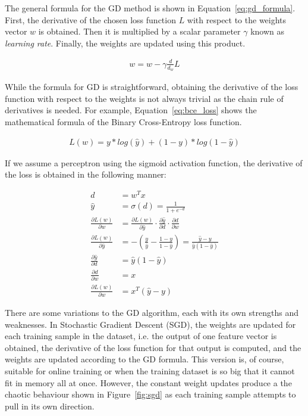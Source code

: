 The general formula for the GD method is shown in Equation~\ref{eq:gd_formula}. First, the derivative of the chosen loss function $L$ with respect to the weights vector $w$ is obtained. Then it is multiplied by a scalar parameter $\gamma$ known as \textit{learning rate}. Finally, the weights are updated using this product.

\begin{align}
    w = w - \gamma \frac{d}{d_w}L
    \label{eq:gd_formula}
\end{align}

While the formula for GD is straightforward, obtaining the derivative of the loss function with respect to the weights is not always trivial as the chain rule of derivatives is needed. For example, Equation~\ref{eq:bce_loss} shows the mathematical formula of the Binary Cross-Entropy loss function.

\begin{align}
    L(w) = y * log(\hat{y}) + (1 - y) * log(1 - \hat{y})
    \label{eq:bce_loss}
\end{align}

If we assume a perceptron using the sigmoid activation function, the derivative of the loss is obtained in the following manner:

\begin{align}
    d &= w^T x \\
    \hat{y} &= \sigma(d) = \frac{1}{1 + e^{-d}} \\
    \frac{\partial L(w)}{\partial w} &= \frac{\partial L(w)}{\partial \hat{y}} \cdot \frac{\partial \hat{y}}{\partial d} \cdot \frac{\partial d}{\partial w}\\
    \frac{\partial L(w)}{\partial \hat{y}} &= -(\frac{y}{\hat{y}} - \frac{1 - y}{1 - \hat{y}}) = \frac{\hat{y} - y}{\hat{y}(1-\hat{y})} \\
    \frac{\partial \hat{y}}{\partial d} &= \hat{y}(1 - \hat{y}) \\
    \frac{\partial d}{\partial w} &= x \\
    \frac{\partial L(w)}{\partial w} &= x^T(\hat{y}-y)
\end{align}

There are some variations to the GD algorithm, each with its own strengths and weaknesses. In Stochastic Gradient Descent (SGD), the weights are updated for each training sample in the dataset, i.e. the output of one feature vector is obtained, the derivative of the loss function for that output is computed, and the weights are updated according to the GD formula. This version is, of course, suitable for online training or when the training dataset is so big that it cannot fit in memory all at once. However, the constant weight updates produce a the chaotic behaviour shown in Figure~\ref{fig:sgd} as each training sample attempts to pull in its own direction.

